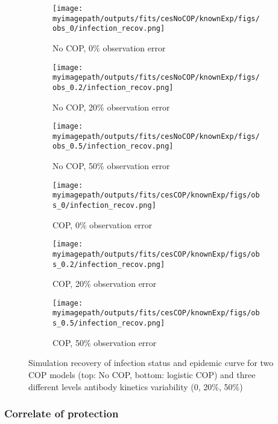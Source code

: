 \documentclass{article}
\newcommand{\myimagepath}{/Users/davidhodgson/Dropbox/Mac (3)/Documents/research/Rpackages/rjmc/}
\begin{document}
\begin{figure}[H]
    \centering
    \begin{subfigure}{0.31\textwidth}
        \centering
        \texttt{[image: \\myimagepath/outputs/fits/cesNoCOP/knownExp/figs/obs\_0/infection\_recov.png]}
        \caption{No COP, 0\% observation error}
    \end{subfigure}
    \begin{subfigure}{0.31\textwidth}
        \centering
        \texttt{[image: \\myimagepath/outputs/fits/cesNoCOP/knownExp/figs/obs\_0.2/infection\_recov.png]}
        \caption{No COP, 20\% observation error}
    \end{subfigure}
    \begin{subfigure}{0.31\textwidth}
        \centering
        \texttt{[image: \\myimagepath/outputs/fits/cesNoCOP/knownExp/figs/obs\_0.5/infection\_recov.png]}
        \caption{No COP, 50\% observation error}
    \end{subfigure}
    
  \begin{subfigure}{0.31\textwidth}
        \centering
        \texttt{[image: \\myimagepath/outputs/fits/cesCOP/knownExp/figs/obs\_0/infection\_recov.png]}
        \caption{ COP, 0\% observation error}
    \end{subfigure}
    \begin{subfigure}{0.31\textwidth}
        \centering
        \texttt{[image: \\myimagepath/outputs/fits/cesCOP/knownExp/figs/obs\_0.2/infection\_recov.png]}
        \caption{ COP, 20\% observation error}
    \end{subfigure}
    \begin{subfigure}{0.31\textwidth}
        \centering
        \texttt{[image: \\myimagepath/outputs/fits/cesCOP/knownExp/figs/obs\_0.5/infection\_recov.png]}
        \caption{ COP, 50\% observation error}
    \end{subfigure}
    
    \caption{Simulation recovery of infection status and epidemic curve for two COP models (top: No COP, bottom: logistic COP) and three different levels antibody kinetics variability (0, 20\%, 50\%)}
\end{figure}


\subsubsection{Correlate of protection}
\end{document}
